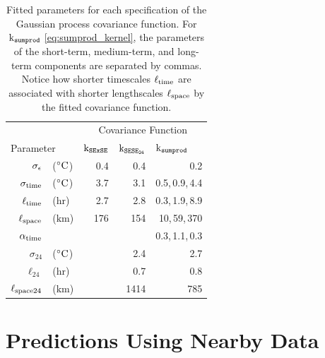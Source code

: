 \documentclass[12pt]{article}
\begin{document}
\begin{table}[tbp]
\begin{center}
\bgroup
\def\arraystretch{1.1}%
\addtolength{\tabcolsep}{6pt}  
\begin{tabular}{r@{ }lrrr}
\hline
&& \multicolumn{3}{c}{Covariance Function} \\
\multicolumn{2}{l}{Parameter} & \multicolumn{1}{l}{\(\operatorname{k_{\mathtt{SExSE}}}\)} & \multicolumn{1}{l}{\(\operatorname{k_{\mathtt{SESE_{24}}}}\)} & \multicolumn{1}{l}{\(\operatorname{k_{\mathtt{sumprod}}}\)} \\
\hline
$\sigma_{\epsilon}$ &	(${}^{\circ}\mathrm{C}$) &	0.4 &	0.4 &	0.2\\ 
\hline
$\sigma_{\mathrm{time}}$ &	(${}^{\circ}\mathrm{C}$) &	3.7 &	3.1 &	0.5,\,0.9,\,4.4\\ 
$\ell_{\mathrm{time}}$ &	($\mathrm{hr}$) &	2.7 &	2.8 &	0.3,\,1.9,\,8.9\\ 
$\ell_{\mathrm{space}}$ &	($\mathrm{km}$) &	176 &	154 &	10,\,59,\,370\\ 
$\alpha_{\mathrm{time}}$ &	 &		 &		 &	0.3,\,1.1,\,0.3\\ 
\hline
$\sigma_{24}$ &	(${}^{\circ}\mathrm{C}$) &		 &	2.4 &	2.7\\ 
$\ell_{24}$ &	($\mathrm{hr}$) &		 &	0.7 &	0.8\\ 
$\ell_{\mathrm{space}{}24}$ &	($\mathrm{km}$) &		 &	1414 &	785\\ 
\hline
\end{tabular}
\addtolength{\tabcolsep}{-3pt}  
\caption{
    Fitted parameters for each specification of the Gaussian process covariance function.
    For \(\operatorname{k_{\mathtt{sumprod}}}\) \autoref{eq:sumprod_kernel}, the parameters of the short-term, medium-term, and long-term components are separated by commas.
    Notice how shorter timescales \(\ell_{\mathrm{time}}\) are associated with shorter lengthscales \(\ell_{\mathrm{space}}\) by the fitted covariance function.
    \label{table:fitted_params}
}
\egroup
\end{center}
\end{table}
    
\section{Predictions Using Nearby Data}\label{predictions-using-nearby-data}
    
\end{document}
